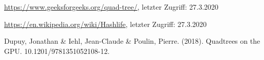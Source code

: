 \documentclass[runningheads]{llncs}
\begin{document}
\begin{thebibliography}{8}
    \url{https://www.geeksforgeeks.org/quad-tree/}, letzter Zugriff: 27.3.2020

    \url{https://en.wikipedia.org/wiki/Hashlife}, letzter Zugriff: 27.3.2020

    Dupuy, Jonathan \& Iehl, Jean-Claude \& Poulin, Pierre. (2018).
    Quadtrees on the GPU. 10.1201/9781351052108-12. 

\end{thebibliography}
\end{document}
